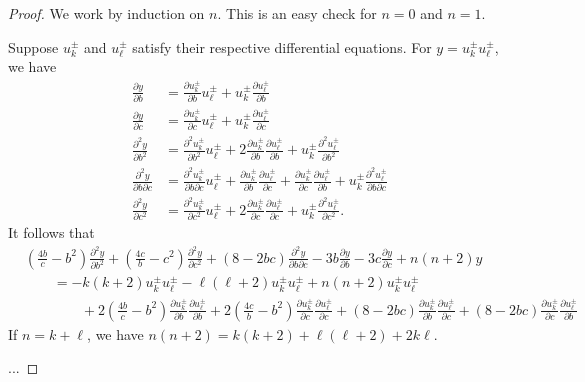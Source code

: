 \documentclass{amsart}
\numberwithin{theorem}{section}
\begin{document}
  \begin{proof}
    We work by induction on $n$.
    This is an easy check for $n=0$ and $n=1$.

    Suppose $u_k^\pm$ and $u_\ell^\pm$ satisfy their respective differential equations.
    For $y=u_k^\pm u_\ell^\pm$, we have 
    \begin{align*}
      \frac{\partial y}{\partial b}
      &=\frac{\partial u_k^\pm}{\partial b} u_\ell^\pm + u_k^\pm \frac{\partial u_\ell^\pm}{\partial b}\\
      \frac{\partial y}{\partial c}
      &=\frac{\partial u_k^\pm}{\partial c} u_\ell^\pm + u_k^\pm \frac{\partial u_\ell^\pm}{\partial c}\\
      \frac{\partial^2 y}{\partial b^2}
      &=\frac{\partial^2 u_k^\pm}{\partial b^2} u_\ell^\pm + 2 \frac{\partial u_k^\pm}{\partial b} \frac{\partial u_\ell^\pm}{\partial b} + u_k^\pm \frac{\partial^2 u_\ell^\pm}{\partial b^2}\\
      \frac{\partial^2 y}{\partial b \partial c}
      &=\frac{\partial^2 u_k^\pm}{\partial b \partial c} u_\ell^\pm + \frac{\partial u_k^\pm}{\partial b} \frac{\partial u_\ell^\pm}{\partial c} + \frac{\partial u_k^\pm}{\partial c} \frac{\partial u_\ell^\pm}{\partial b} + u_k^\pm \frac{\partial^2 u_\ell^\pm}{\partial b \partial c}\\
      \frac{\partial^2 y}{\partial c^2}
      &=\frac{\partial^2 u_k^\pm}{\partial c^2} u_\ell^\pm + 2 \frac{\partial u_k^\pm}{\partial c} \frac{\partial u_\ell^\pm}{\partial c} + u_k^\pm \frac{\partial^2 u_\ell^\pm}{\partial c^2}.
    \end{align*}
    It follows that
    \begin{align*}
      & \left(\frac{4b}{c}-b^2\right)\frac{\partial^2 y}{\partial b^2} + \left(\frac{4c}{b}-c^2\right)\frac{\partial^2 y}{\partial c^2} + (8-2bc)\frac{\partial^2 y}{\partial b\partial c} - 3b\frac{\partial y}{\partial b} - 3c\frac{\partial y}{\partial c} + n(n+2) y\\
      & \qquad = -k(k+2) u_k^\pm u_\ell^\pm -\ell(\ell+2) u_k^\pm u_\ell^\pm + n(n+2) u_k^\pm u_\ell^\pm\\
      & \qquad \qquad + 2\left(\frac{4b}{c}-b^2\right)\frac{\partial u_k^\pm}{\partial b} \frac{\partial u_\ell^\pm}{\partial b}  + 2\left(\frac{4c}{b}-b^2\right)\frac{\partial u_k^\pm}{\partial c} \frac{\partial u_\ell^\pm}{\partial c} + (8-2bc)\frac{\partial u_k^\pm}{\partial b} \frac{\partial u_\ell^\pm}{\partial c} + (8-2bc)\frac{\partial u_k^\pm}{\partial c} \frac{\partial u_\ell^\pm}{\partial b}
    \end{align*}
    If $n=k+\ell$, we have $n(n+2)=k(k+2)+\ell(\ell+2)+2k\ell$.

    ...
  \end{proof}
\end{document}
